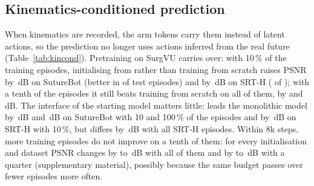 \subsection{Kinematics-conditioned prediction}\label{sec:kincond}
When kinematics are recorded, the arm tokens carry them instead of latent actions, so the prediction no longer uses actions inferred from the real future (Table~\ref{tab:kincond}). Pretraining on SurgVU carries over: with 10\,\% of the training episodes, initialising from \method{} rather than training from scratch raises PSNR by \,dB  on SutureBot (better in  of  test episodes) and by \,dB  on SRT-H ( of ); with a tenth of the episodes it still beats training from scratch on all of them, by  and \,dB. The interface of the starting model matters little: \method{} leads the monolithic model by \,dB  and \,dB  on SutureBot with 10 and 100\,\% of the episodes and by \,dB  on SRT-H with 10\,\%, but differs by \,dB  with all SRT-H episodes. Within 8k steps, more training episodes do not improve on a tenth of them: for every initialisation and dataset PSNR changes by  to \,dB with all of them and by  to \,dB with a quarter (supplementary material), possibly because the same budget passes over fewer episodes more often.

